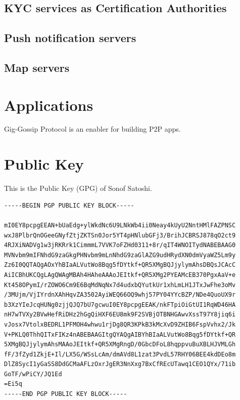\documentclass{article}
\begin{document}
\subsection{KYC services as Certification Authorities}

\subsection{Push notification servers}

\subsection{Map servers}

\section{Applications}

Gig-Gossip Protocol is an enabler for building P2P apps.


\section{Public Key}
This is the Public Key (GPG) of Sonof Satoshi.
\label{gpgkey}
\begin{small}
\begin{verbatim}
-----BEGIN PGP PUBLIC KEY BLOCK-----

mI0EY8pcpgEEAN+bUaEdg+ylWkdNc6U9LNkWb4ii0Neay4kUyU2NntHMlFAZPNSC
wxJ8PlbrQnOGeeGNyfZtjZKTSn0Jor5YT4pHNlubGFj3/BrihJCBRSJ878qO2ct9
4RJXiNADVg1w3jRKRrk1CimmmL7VVK7oFZHd0311+8r/qIT4WNOITydNABEBAAG0
MVNvbm9mIFNhdG9zaGkgPHNvbm9mLnNhdG9zaGlAZG9udHRydXN0dmVyaWZ5Lm9y
Zz6I0QQTAQgAOxYhBIaALVutWo8Bqg5fDYtkf+QR5XMgBQJjylymAhsDBQsJCAcC
AiICBhUKCQgLAgQWAgMBAh4HAheAAAoJEItkf+QR5XMg2PYEAMcEB370PgxAaV+e
Kt458OPymI/rZOWO6Cm9E6BqMdNqNx7d4udxbQYutkUr1xhLmLH1JTxJwFhe3oMv
/3MUjm/VjIYrdnXAhHqvZA3502AyiWEQ66OQ9whj57PY04YYcBZP/NDe4QuoUX9r
b3XzYIeJcqHUNg0zjjQJQ7bU7gcwuI0EY8pcpgEEAK/nkFTpiOiGtUI1RqWD46HA
nH7wTVXy2BVwHefRiDHz2hGgQiHXF6EU8mk9F2SVBjOTBNHGAwvXssT97Y8jiq6i
vJosx7VtolxBEDRL1PFMOH4whwu1rjDg8QR3KPkB3kMcXvD9ZHIB6FspVvhx2/Jk
V+PKLQ0ThhQITxFIKz4nABEBAAGItgQYAQgAIBYhBIaALVutWo8Bqg5fDYtkf+QR
5XMgBQJjylymAhsMAAoJEItkf+QR5XMgRngD/0GbcDFoL8hqppvuBuXBLHJVMLGh
fF/3fZyd1ZkjE+Il/LX5G/WSsLcAm/dmAVd8L1zat3PvdL57RHY06BEE4kdDEo8m
DlZ8SycI1yGaSS8DdGCMaAFLzOxrJgER3NnXxg7BxCfREcUTawq1CEO1QYx/71ib
GoTF/wPiCY/JQ1Ed
=Ei5q
-----END PGP PUBLIC KEY BLOCK-----
\end{verbatim}
\end{small}



  
\end{document}
